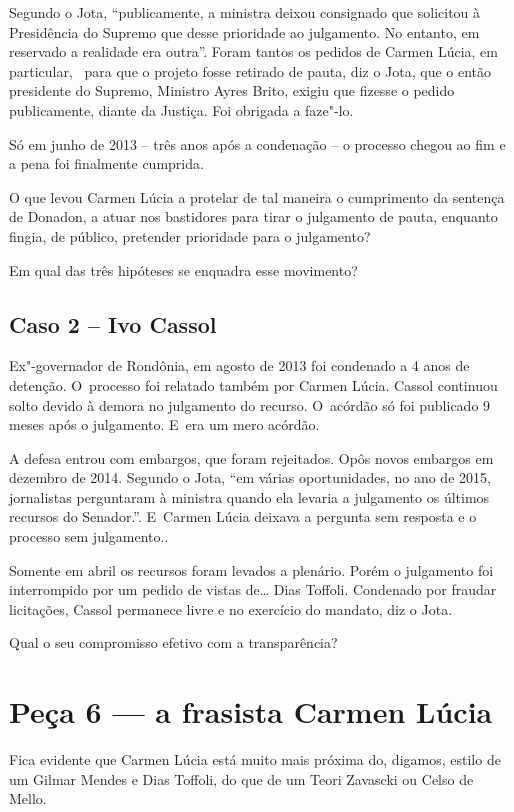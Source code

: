 Segundo o Jota, ``publicamente, a ministra deixou consignado que
solicitou à Presidência do Supremo que desse prioridade ao julgamento.
No entanto, em reservado a realidade era outra''. Foram tantos os
pedidos de Carmen Lúcia, em particular, ~para que o projeto fosse
retirado de pauta, diz o Jota, que o então presidente do Supremo,
Ministro Ayres Brito, exigiu que fizesse o pedido publicamente, diante
da  Justiça. Foi obrigada a faze"-lo.

Só em junho de 2013 -- três anos após a condenação -- o processo chegou
ao fim e a pena foi finalmente cumprida.

O que levou Carmen Lúcia a protelar de tal maneira o cumprimento da
sentença de Donadon, a atuar nos bastidores para tirar o julgamento de
pauta, enquanto fingia, de público, pretender prioridade para o
julgamento?

Em qual das três hipóteses se enquadra esse movimento?

\subsection{Caso 2 -- Ivo Cassol}

Ex"-governador de Rondônia, em agosto de 2013 foi condenado a 4 anos de
detenção. O~processo foi relatado também por Carmen Lúcia. Cassol
continuou solto devido à demora no julgamento do recurso. O~acórdão só
foi publicado 9 meses após o julgamento. E~era um mero acórdão.

A defesa entrou com embargos, que foram rejeitados. Opôs novos embargos
em dezembro de 2014. Segundo o Jota, ``em várias oportunidades, no ano
de 2015, jornalistas perguntaram à ministra quando ela levaria a
julgamento os últimos recursos do Senador.''. E~Carmen Lúcia deixava a
pergunta sem resposta e o processo sem julgamento..

Somente em abril os recursos foram levados a plenário. Porém o
julgamento foi interrompido por um pedido de vistas de… Dias
Toffoli. Condenado por fraudar licitações, Cassol permanece livre e no
exercício do mandato, diz o Jota.

Qual o seu compromisso efetivo com a transparência?

\section{Peça 6 --- a frasista Carmen Lúcia}

Fica evidente que Carmen Lúcia está muito mais próxima do, digamos,
estilo de um Gilmar Mendes e Dias Toffoli, do que de um Teori Zavascki
ou Celso de Mello.

